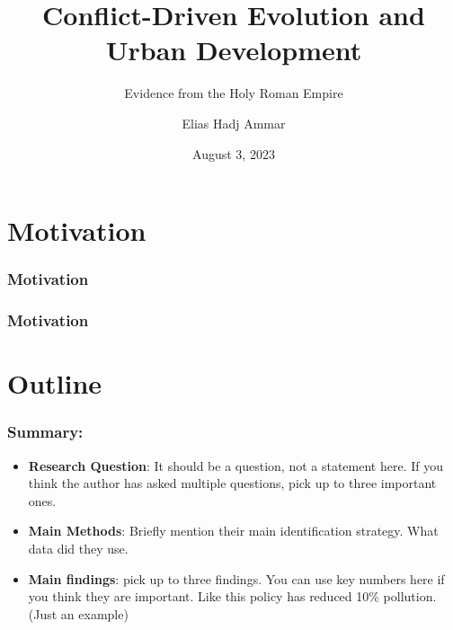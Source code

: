 \documentclass{beamer}
\title[Kolloquium]{Conflict-Driven Evolution and Urban Development} %
\subtitle{Evidence from the Holy Roman Empire}
\author{Elias Hadj Ammar} %
\institute[LMU] %
{
LMU Munich\\ %
\medskip
\textit{Elias.Ammar@campus.lmu.de} %
}
\date{August 3, 2023} %
\begin{document}
\begin{frame}
\titlepage %
\end{frame}






\section{Motivation} %

\begin{frame}
\frametitle{Motivation}


\end{frame}


\begin{frame}
\frametitle{Motivation}
    
\end{frame}


\section{Outline} %

\begin{frame}
\frametitle{Summary:}
\justifying
\begin{itemize}
\item \textbf{Research Question}: It should be a question, not a statement here. If you think the author has asked multiple questions, pick up to three important ones. 
\item \textbf{Main Methods}: Briefly mention their main identification strategy. What data did they use. 
\item \textbf{Main findings}: pick up to three findings. You can use key numbers here if you think they are important. Like this policy has reduced 10\% pollution.(Just an example)
\end{itemize}

\end{frame}

\end{document}
